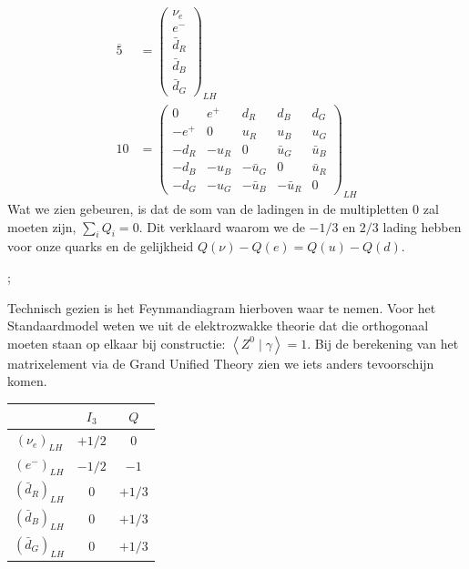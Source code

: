 \documentclass[../main.tex]{subfiles}
\begin{document}
\begin{equation}
    \begin{aligned}
        \label{eq:qut_multipletten}
        \overline{5}&=\left(\begin{array}{c}
                \nu_{e} \\
                e^{-} \\
                \bar{d}_{R} \\
                \bar{d}_{B} \\
                \bar{d}_{G}
        \end{array}\right)_{L H}\\
        10&=\left(\begin{array}{ccccc}
                0 & e^{+} & d_{R} & d_{B} & d_{G} \\
                -e^{+} & 0 & u_{R} & u_{B} & u_{G} \\
                -d_{R} & -u_{R} & 0 & \bar{u}_{G} & \bar{u}_{B} \\
                -d_{B} & -u_{B} & -\bar{u}_{G} & 0 & \bar{u}_{R} \\
                -d_{G} & -u_{G} & -\bar{u}_{B} & -\bar{u}_{R} & 0
        \end{array}\right)_{L H}
    \end{aligned}
\end{equation}
Wat we zien gebeuren, is dat de som van de ladingen in de multipletten 0 zal moeten zijn, $\sum_{i} Q_{i}=0$. Dit verklaard waarom we de $-1/3$ en $2/3$ lading hebben voor onze quarks en de gelijkheid $Q(\nu)-Q(e)=Q(u)-Q(d)$.\\
\begin{center}
    ;
\end{center}
Technisch gezien is het Feynmandiagram hierboven waar te nemen. Voor het Standaardmodel weten we uit de elektrozwakke theorie dat die orthogonaal moeten staan op elkaar bij constructie: $\left< Z^0\mid \gamma\right> = 1$. Bij de berekening van het matrixelement via de Grand Unified Theory zien we iets anders tevoorschijn komen.
\begin{table}[h]
    \centering
    \begin{tabular}{c|cc}
        & $I_{3}$ & $Q$ \\
        \hline
        $\left(\nu_{e}\right)_{L H}$ & $+1 / 2$ & $0$ \\
        $\left(e^{-}\right)_{L H}$ & $-1 / 2$ & $-1$ \\
        $\left(\bar{d}_{R}\right)_{L H}$ & $0$ & $+1 / 3$ \\
        $\left(\bar{d}_{B}\right)_{L H}$ & $0$ & $+1 / 3$ \\
        $\left(\bar{d}_{G}\right)_{L H}$ & $0$ & $+1 / 3$
    \end{tabular}
\end{table}
\end{document}
